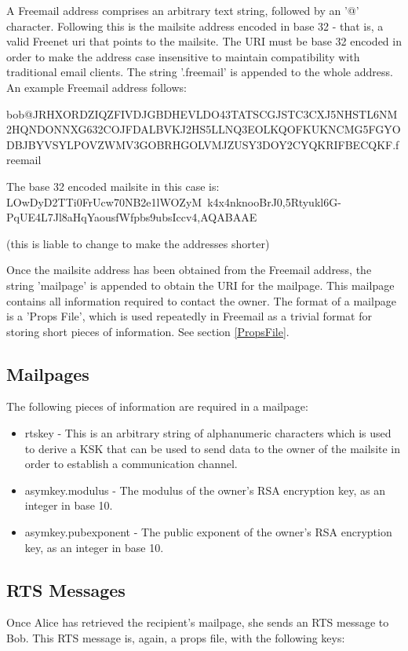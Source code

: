 \documentclass[12pt,a4paper]{article}
\begin{document}
A Freemail address comprises an arbitrary text string, followed by an '@' character. Following this is the mailsite address encoded in base 32 - that is, a valid Freenet uri that points to the mailsite. The URI must be base 32 encoded in order to make the address case insensitive to maintain compatibility with traditional email clients. The string '.freemail' is appended to the whole address. An example Freemail address follows:

bob@JRHXORDZIQZFIVDJ\-GBDHEVLDO43TATSCGJST\-C3CXJ5NHSTL6NM2HQ\-NDONNXG632COJFD\-ALBVKJ2HS5LLNQ3E\-OLKQOFKUKNCMG5F\-GYODBJBY\-VSYLPOVZ\-WMV3GOBRHGOLVMJ\-ZUSY3DOY2CY\-QKRIFBECQKF.freemail

The base 32 encoded mailsite in this case is: LOwDyD2TTi0FrUcw70N\-B2e1lWOZyM~k4x4n\-knooBrJ0,5Rtyu\-kl6G-PqUE4L7\-Jl8aHqYaous\-fWfpbs9ubsI\-ccv4,AQABAAE

(this is liable to change to make the addresses shorter)

Once the mailsite address has been obtained from the Freemail address, the string 'mailpage' is appended to obtain the URI for the mailpage. This mailpage contains all information required to contact the owner. The format of a mailpage is a 'Props File', which is used repeatedly in Freemail as a trivial format for storing short pieces of information. See section \ref{PropsFile}.

\subsection{Mailpages}
The following pieces of information are required in a mailpage:

\begin{itemize}
\item rtskey - This is an arbitrary string of alphanumeric characters which is used to derive a KSK that can be used to send data to the owner of the mailsite in order to establish a communication channel.
\item asymkey.modulus - The modulus of the owner's RSA encryption key, as an integer in base 10.
\item asymkey.pubexponent - The public exponent of the owner's RSA encryption key, as an integer in base 10.
\end{itemize}

\subsection{RTS Messages}
Once Alice has retrieved the recipient's mailpage, she sends an RTS message to Bob. This RTS message is, again, a props file, with the following keys:
\end{document}
